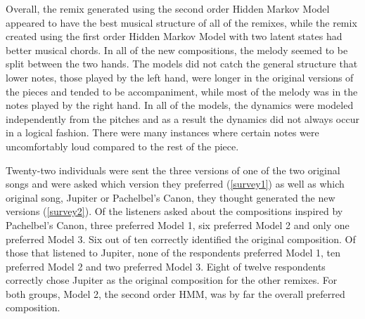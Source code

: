 \documentclass{article} %
\begin{document}
Overall, the remix generated using the second order Hidden Markov Model appeared to have the best musical structure of all of the remixes, while the remix created using the first order Hidden Markov Model with two latent states had better musical chords. In all of the new compositions, the melody seemed to be split between the two hands. The models did not catch the general structure that lower notes, those played by the left hand, were longer in the original versions of the pieces and tended to be accompaniment, while most of the melody was in the notes played by the right hand. In all of the models, the dynamics were modeled independently from the pitches and as a result the dynamics did not always occur in a logical fashion. There were many instances where certain notes were uncomfortably loud compared to the rest of the piece.

Twenty-two individuals were sent the three versions of one of the two original songs and were asked which version they preferred (\autoref{survey1}) as well as which original song, Jupiter or Pachelbel's Canon, they thought generated the new versions (\autoref{survey2}). Of the listeners asked about the compositions inspired by Pachelbel's Canon, three preferred Model 1, six preferred Model 2 and only one preferred Model 3. Six out of ten correctly identified the original composition.  Of those that listened to Jupiter, none of the respondents preferred Model 1, ten preferred Model 2 and two preferred Model 3. Eight of twelve respondents correctly chose Jupiter as the original composition for the other remixes. 
For both groups, Model 2, the second order HMM,  was by far the overall preferred composition.  
\end{document}
